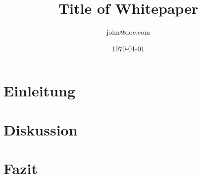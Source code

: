 \documentclass[12pt]{article}
\begin{document}
\title{Title of Whitepaper}
\author{\small john@doe.com}
\date{\today}

\maketitle

\begin{abstract}
\lipsum[1]
\end{abstract}

\section{Einleitung}
\lipsum[2-3]

\section{Diskussion}
\lipsum[4-7]

\section{Fazit}
\lipsum[8]
\end{document}
